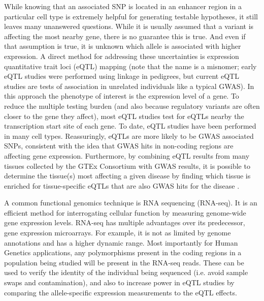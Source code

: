While knowing that an associated SNP is located in an enhancer region
in a particular cell type is extremely helpful for generating testable
hypotheses, it still leaves many unanswered questions. While it is
usually assumed that a variant is affecting the most nearby gene,
there is no guarantee this is true. And even if that assumption is
true, it is unknown which allele is associated with higher
expression. A direct method for addressing these uncertainties is
expression quantitative trait loci (eQTL) mapping (note that the name
is a misnomer; early eQTL studies were performed using linkage in
pedigrees, but current eQTL studies are tests of association in
unrelated individuals like a typical GWAS). In this approach the
phenotype of interest is the expression level of a gene. To reduce the
multiple testing burden (and also because regulatory variants are
often closer to the gene they affect), most eQTL studies test for
eQTLs nearby the transcription start site of each gene. To date, eQTL
studies have been performed in many cell types. Reassuringly, eQTLs
are more likely to be GWAS associated SNPs, consistent with the idea
that GWAS hits in non-coding regions are affecting gene
expression. Furthermore, by combining eQTL results from many tissues
collected by the GTEx Consortium with GWAS results, it is possible to
determine the tissue(s) most affecting a given disease by finding
which tissue is enriched for tissue-specific eQTLs that are also GWAS
hits for the disease \citep{Ongen2016}.

A common functional genomics technique is RNA sequencing (RNA-seq). It
is an efficient method for interrogating cellular function by
measuring genome-wide gene expression levels. RNA-seq has multiple
advantages over its predecessor, gene expression microarrays. For
example, it is not as limited by genome annotations and has a higher
dynamic range. Most importantly for Human Genetics applications, any
polymorphisms present in the coding regions in a population being
studied will be present in the RNA-seq reads. These can be used to
verify the identity of the individual being sequenced (i.e. avoid
sample swaps and contamination), and also to increase power in eQTL
studies by comparing the allele-specific expression measurements to
the eQTL effects.
